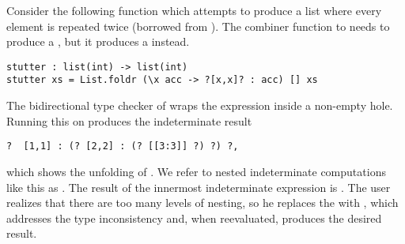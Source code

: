 
%
Consider the following function which attempts to produce a
list where every element is repeated twice (borrowed from \citet{Osera2015}).
%
The combiner function to  needs to produce a , but
it produces a  instead.

\begin{lstlisting}
stutter : list(int) -> list(int)
stutter xs = List.foldr (\x acc -> ?[x,x]? : acc) [] xs
\end{lstlisting}

\noindent
%
The bidirectional type checker of \citet{popl-paper} wraps the expression
\li{[x,x]} inside a non-empty hole.
%
%
Running this on  produces the indeterminate result

\begin{lstlisting}
?  [1,1] : (? [2,2] : (? [[3:3]] ?) ?) ?,
\end{lstlisting}

\noindent
%
which shows the unfolding of .
%
We refer to nested indeterminate computations like this as .
%
The result of the innermost indeterminate expression is \li{[[3,3]]}.
%
The user realizes that there are too many levels of nesting, so
he replaces the \li{(:)} with , which addresses the type inconsistency
and, when reevaluated, produces the desired result.



